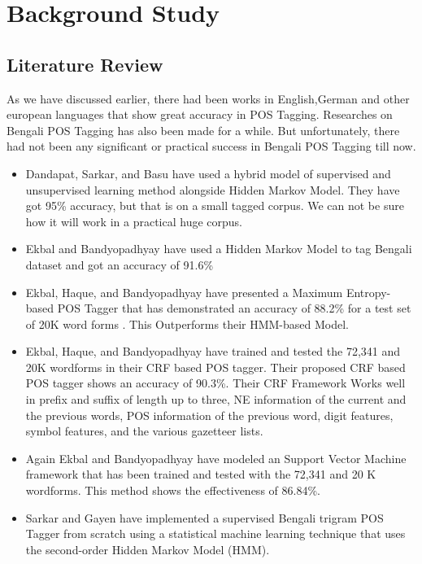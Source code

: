 \documentclass{standalone}
\begin{document}
\chapter{Background Study}
\section{Literature Review}
As we have discussed earlier, there had been works in English,German and other european languages that show great accuracy in POS Tagging. Researches on Bengali POS Tagging has also been made for a while. But unfortunately, there had not been any significant or practical success in Bengali POS Tagging till now.\\
\begin{itemize}
    \item Dandapat, Sarkar, and Basu have used a hybrid model of supervised and unsupervised learning method alongside Hidden Markov Model\cite{dandapat2004hybrid}. They have got 95\% accuracy, but that is on a small tagged corpus. We can not be sure how it will work in a practical huge corpus.\\
    \item Ekbal and Bandyopadhyay have used a Hidden Markov Model to tag Bengali dataset and got an accuracy of 91.6\% \cite{ekbal2007lexicon}\\
    \item Ekbal, Haque, and Bandyopadhyay have presented a Maximum Entropy-based POS Tagger that has demonstrated an accuracy of 88.2\% for a test set of 20K word forms \cite{ekbal2008maximum}. This Outperforms their HMM-based Model.\\
    \item Ekbal, Haque, and Bandyopadhyay have trained and tested the 72,341 and 20K wordforms in their CRF based POS tagger\cite{ekbal2007bengali}. Their proposed CRF based POS tagger shows an accuracy of 90.3\%. Their CRF Framework Works well in prefix and suffix of length up to three, NE information of the current and the previous words, POS information of the previous word, digit features, symbol features, and the various gazetteer lists.\\
    \item Again Ekbal and Bandyopadhyay have modeled an Support Vector Machine framework that has been trained and tested with the 72,341 and 20 K wordforms. This method shows the effectiveness of 86.84\%\cite{ekbalsvm}.\\
    \item Sarkar and Gayen have implemented a supervised Bengali trigram POS Tagger from scratch using a statistical machine learning technique that uses the second-order Hidden Markov Model (HMM)\cite{sarkar}.\\

\end{itemize}
\end{document}
